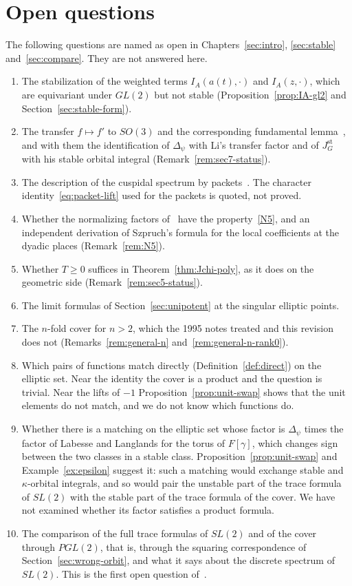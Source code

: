 \section*{Open questions}

The following questions are named as open in Chapters~\ref{sec:intro},
\ref{sec:stable} and~\ref{sec:compare}. They are not answered here.

\begin{enumerate}[label=\arabic*.]
\item The stabilization of the weighted terms $I_A(a(t),\cdot)$ and
  $I_A(z,\cdot)$, which are equivariant under $GL(2)$ but not stable
  (Proposition~\ref{prop:IA-gl2} and Section~\ref{sec:stable-form}).
\item The transfer $f\mapsto f'$ to $SO(3)$ and the corresponding
  fundamental lemma~\cite{Li11,Li12b}, and with them the identification
  of $\Delta_\psi$ with Li's transfer factor and of $J^{\mathrm{st}}_G$
  with his stable orbital integral (Remark~\ref{rem:sec7-status}).
\item The description of the cuspidal spectrum by
  packets~\cite{Wa80,Wa91,GI18}. The character
  identity~\eqref{eq:packet-lift} used for the packets is quoted, not
  proved.
\item Whether the normalizing factors of~\cite{Li12a} have the
  property~\ref{N5}, and an independent derivation of Szpruch's formula
  for the local coefficients at the dyadic places
  (Remark~\ref{rem:N5}).
\item Whether $T\ge0$ suffices in Theorem~\ref{thm:Jchi-poly}, as it does
  on the geometric side (Remark~\ref{rem:sec5-status}).
\item The limit formulas of Section~\ref{sec:unipotent} at the singular
  elliptic points.
\item The $n$-fold cover for $n>2$, which the 1995 notes treated and
  this revision does not (Remarks~\ref{rem:general-n}
  and~\ref{rem:general-n-rank0}).
\item Which pairs of functions match directly
  (Definition~\ref{def:direct}) on the elliptic set. Near the identity
  the cover is a product and the question is trivial. Near the lifts of
  $-1$ Proposition~\ref{prop:unit-swap} shows that the unit elements do
  not match, and we do not know which functions do.
\item Whether there is a matching on the elliptic set whose factor is
  $\Delta_\psi$ times the factor of Labesse and Langlands for the torus of
  $F[\gamma]$, which changes sign between the two classes in a stable
  class. Proposition~\ref{prop:unit-swap} and Example~\ref{ex:epsilon}
  suggest it: such a matching would exchange stable and $\kappa$-orbital
  integrals, and so would pair the unstable part of the trace formula of
  $SL(2)$ with the stable part of the trace formula of the cover. We have
  not examined whether its factor satisfies a product formula.
\item The comparison of the full trace formulas of $SL(2)$ and of the
  cover through $PGL(2)$, that is, through the squaring correspondence of
  Section~\ref{sec:wrong-orbit}, and what it says about the discrete
  spectrum of $SL(2)$. This is the first open question of~\cite{JC26}.
\end{enumerate}
